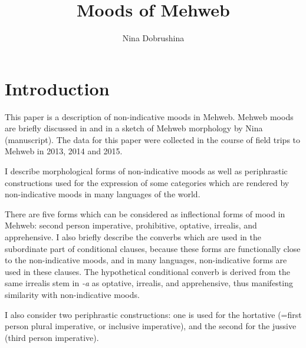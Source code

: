 ﻿\documentclass[output=paper]{langsci/langscibook}
\title{Moods of Mehweb}
\author{Nina Dobrushina\affiliation{National Research University Higher School of
    Economics, Linguistic Convergence Laboratory,
ndobrushina@hse.ru}}
\begin{document}
\maketitle


\let\exfont\rm
\let\eachwordone\rm

\section{Introduction}

This paper is a description of non-indicative moods in Mehweb. Mehweb
moods are briefly discussed in \citet{magometov1982,khajdakov1985} and in a
sketch of Mehweb morphology by Nina \citeauthor{sumbatova:mehweb-grammar} (manuscript). The data for
this paper were collected in the course of field trips to Mehweb in
2013, 2014 and 2015.

I describe morphological forms of non-indicative moods as well as
periphrastic constructions used for the expression of some categories
which are rendered by non-indicative moods in many languages of the
world.

There are five forms which can be considered as inflectional forms of
mood in Mehweb: second person imperative, prohibitive, optative,
irrealis, and apprehensive. I also briefly describe the converbs which
are used in the subordinate part of conditional clauses, because these
forms are functionally close to the non-indicative moods, and in many
languages, non-indicative forms are used in these clauses. The
hypothetical conditional converb is derived from the same irrealis stem
in \emph{-a} as optative, irrealis, and apprehensive, thus manifesting
similarity with non-indicative moods.

I also consider two periphrastic constructions: one is used for the
hortative (=first person plural imperative, or inclusive imperative),
and the second for the jussive (third person imperative).
\end{document}
